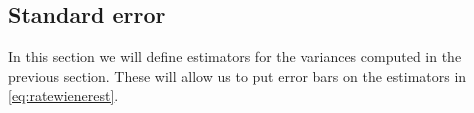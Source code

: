 \documentclass[12pt]{article}
\begin{document}

\subsection{Standard error}\label{sec:poissonstderr}

In this section we will define estimators for the variances computed in the previous section.
These will allow us to put error bars on the estimators in \eqref{eq:ratewienerest}.















\end{document}
